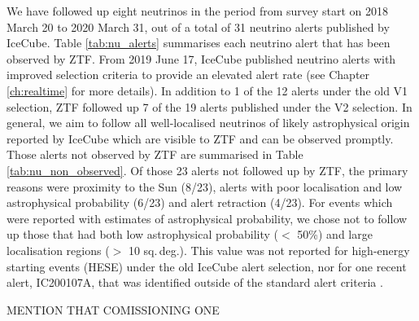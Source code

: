  We have followed up eight neutrinos in the period from survey start on 2018 March 20 to 2020 March 31, out of a total of 31 neutrino alerts published by IceCube. Table \ref{tab:nu_alerts} summarises each neutrino alert that has been observed by ZTF. From 2019 June 17, IceCube published neutrino alerts with improved selection criteria to provide an elevated alert rate  (see Chapter \ref{ch:realtime} for more details). In addition to 1 of the 12 alerts under the old V1 selection, ZTF followed up 7 of the 19 alerts published under the V2 selection. In general, we aim to follow all well-localised neutrinos of likely astrophysical origin reported by IceCube which are visible to ZTF and can be observed promptly. Those alerts not observed by ZTF are summarised in Table \ref{tab:nu_non_observed}. Of those 23 alerts not followed up by ZTF, the primary reasons were proximity to the Sun (8/23), alerts with poor localisation and low astrophysical probability (6/23) and alert retraction (4/23). For events which were reported with estimates of astrophysical probability, we chose not to follow up those that had both low astrophysical probability ($<$ 50\%) and large localisation regions ($>$ 10 sq.\,deg.). This value was not reported for high-energy starting events (HESE) under the old IceCube alert selection, nor for one recent alert, IC200107A, that was identified outside of the standard alert criteria .
 
 MENTION THAT COMISSIONING ONE
 
